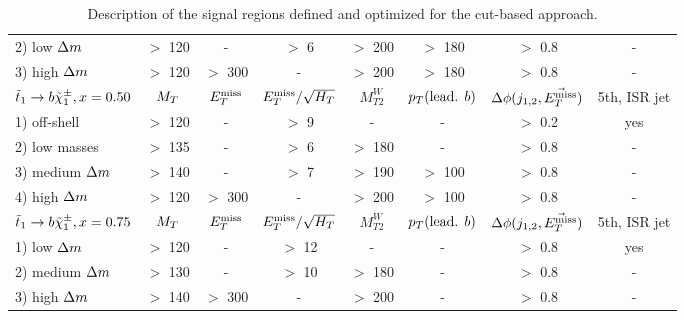 \begin{table}[!ht]
{\begin{center}
\begin{tabular}{|l|ccccccc|}
    2) low    $\Delta m$ & $>$ 120   &  -       &    $>$  6       &  $>$ 200   & $>$ 180               &  $>$ 0.8      & -             \\
    3) high   $\Delta m$ & $>$ 120   & $>$ 300  &     -           &  $>$ 200   & $>$ 180               &  $>$ 0.8      & -             \\
    \hline
    $\tilde{t}_1 \rightarrow b\tilde{\chi}_1^\pm, x=0.50$     & $M_T$     & $E_T^\text{miss}$    & $E_T^\text{miss}/\sqrt{H_T}$ & $M_{T2}^W$ & $p_T(\text{lead. }b)$ & $\Delta\phi(j_{1,2},\vec{E_T^\text{miss}})$ & 5th, ISR jet  \\
    \hline
    1) off-shell        &  $>$ 120  &   -      &  $>$  9         &    -       & -                     &  $>$ 0.2      & yes           \\
    2) low masses       &  $>$ 135  &   -      &  $>$  6         & $>$ 180    & -                     &  $>$ 0.8      & -             \\
    3) medium $\Delta m$ &  $>$ 140  &   -      &  $>$  7         & $>$ 190    & $>$ 100               &  $>$ 0.8      & -             \\
    4) high   $\Delta m$ &  $>$ 120  & $>$ 300  &   -             & $>$ 200    & $>$ 100               &  $>$ 0.8      & -             \\
    \hline
    $\tilde{t}_1 \rightarrow b\tilde{\chi}_1^\pm, x=0.75$   & $M_T$     & $E_T^\text{miss}$    & $E_T^\text{miss}/\sqrt{H_T}$ & $M_{T2}^W$ & $p_T(\text{lead. }b)$ & $\Delta\phi(j_{1,2},\vec{E_T^\text{miss}})$ & 5th, ISR jet  \\
    \hline
    1) low    $\Delta m$ &  $>$ 120  &   -      &  $>$  12        &     -      &      -                &  $>$ 0.8      & yes           \\
    2) medium $\Delta m$ &  $>$ 130  &   -      &  $>$  10        &  $>$ 180   &      -                &  $>$ 0.8      & -             \\
    3) high   $\Delta m$ &  $>$ 140  & $>$ 300  &    -            &  $>$ 200   &      -                &  $>$ 0.8      & -             \\
    \hline                                                 
    \end{tabular}
\caption{Description of the signal regions defined and optimized for the cut-based approach. \label{tab:cutAndCountCuts}} 
\end{center}}
\end{table}


